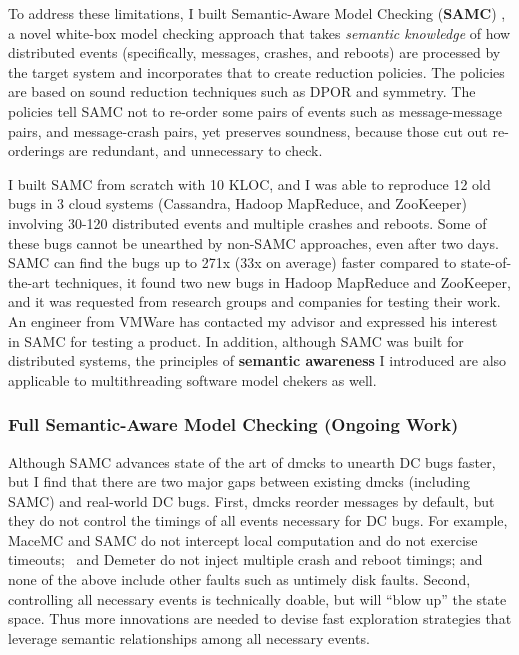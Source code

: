 \documentclass[10pt]{article}
\begin{document}
To address these limitations, I built Semantic-Aware Model Checking
(\textbf{SAMC}) \cite{Leesatapornwongsa+15-SamcIssta,Leesatapornwongsa+14-Samc},
a novel white-box model checking approach that takes \textit{semantic knowledge}
of how distributed events (specifically, messages, crashes, and reboots) are
processed by the target system and incorporates that to create reduction
policies. The policies are based on sound reduction techniques such as DPOR and
symmetry. The policies tell SAMC not to re-order some pairs of events such as
message-message pairs, and message-crash pairs, yet preserves soundness, because
those cut out re-orderings are redundant, and unnecessary to check.

I built SAMC from scratch with 10 KLOC, and I was able to reproduce 12 old bugs
in 3 cloud systems (Cassandra, Hadoop MapReduce, and ZooKeeper) involving 30-120
distributed events and multiple crashes and reboots. Some of these bugs cannot
be unearthed by non-SAMC approaches, even after two days. SAMC can find the bugs
up to 271x (33x on average) faster compared to state-of-the-art techniques, it
found two new bugs in Hadoop MapReduce and ZooKeeper, and it was requested from
research groups and companies for testing their work. An engineer from VMWare
has contacted my advisor and expressed his interest in SAMC for testing a
product. In addition, although SAMC was built for distributed systems, the
principles of \textbf{semantic awareness} I introduced are also applicable to
multithreading software model chekers as well.

\subsubsection*{Full Semantic-Aware Model Checking (Ongoing Work)} 

Although SAMC advances state of the art of dmcks to unearth DC bugs faster, but
I find that there are two major gaps between existing dmcks (including SAMC) and
real-world DC bugs. First, dmcks reorder messages by default, but they do not
control the timings of all events necessary for DC bugs. For example, MaceMC and
SAMC do not intercept local computation and do not exercise timeouts; \modist\
and Demeter do not inject multiple crash and reboot timings; and none of the
above include other faults such as untimely disk faults.
%
Second, controlling all necessary events is technically doable, but will ``blow
up'' the state space. Thus more innovations are needed to devise fast
exploration strategies that leverage semantic relationships among all necessary
events.
\end{document}
